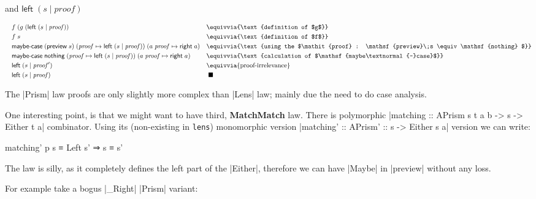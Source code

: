 \documentclass{article}
\begin{document}
and $\mathsf{left}\;(s \mid \mathit{proof})$

\begin{equation}
\begin{aligned}
  \quad & f\; (g\; (\mathsf{left}\;(s \mid \mathit{proof}))       &&\equivvia{\text{definition of $g$}} \\
      & f\; s                                          &&\equivvia{\text{definition of $f$}}  \\
      & \mathsf{maybe\textnormal{-}case}\;(\mathsf{preview}\;s)\; (\mathit{proof} \mapsto \mathsf{left}\;(s \mid \mathit{proof}))\; (a\; \mathit{proof} \mapsto \mathsf{right}\; a)
                                                       &&\equivvia{\text{using the $\mathit{proof} : \mathsf{preview}\;s \equiv \mathsf{nothing} $}} \\
      & \mathsf{maybe\textnormal{-}case}\;\mathsf{nothing}\; (\mathit{proof} \mapsto \mathsf{left}\;(s \mid \mathit{proof}))\; (a\; \mathit{proof} \mapsto \mathsf{right}\; a)
                                               &&\equivvia{\text{calculation of $\mathsf{maybe\textnormal{-}case}$}} \\
      & \mathsf{left}\;(s \mid \mathit{proof}') && \equivvia{\text{proof-irrelevance}} \\
      & \mathsf{left}\;(s \mid \mathit{proof}) &&\;\blacksquare
\end{aligned}
\end{equation}

The |Prism| law proofs are only slightly more complex than |Lens| law;
mainly due the need to do case analysis.

One interesting point, is that we might want to have third, \textbf{MatchMatch} law.
There is polymorphic |matching :: APrism s t a b -> s -> Either t a| combinator.
Using its (non-existing in \texttt{lens}) monomorphic version |matching' :: APrism' :: s -> Either s a|
version we can write:
\begin{code}
matching' p s ≡ Left s' ⇒ s ≡ s'
\end{code}
The law is silly, as it completely defines the left part of the |Either|,
therefore we can have |Maybe| in |preview| without any loss.

For example take a bogus |_Right| |Prism| variant:

\end{document}
